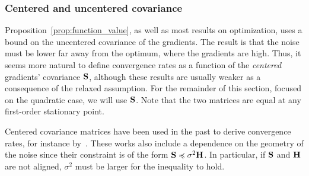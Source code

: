 \subsubsection{Centered and uncentered covariance}
Proposition~\ref{prop:function_value}, as well as most results on optimization, uses a bound on the uncentered covariance of the gradients. The result is that the noise must be lower far away from the optimum, where the gradients are high. Thus, it seems more natural to define convergence rates as a function of the \emph{centered} gradients' covariance ${\mathbf{S}}$, although these results are usually weaker as a consequence of the relaxed assumption. For the remainder of this section, focused on the quadratic case, we will use ${\mathbf{S}}$. Note that the two matrices are equal at any first-order stationary point.

Centered covariance matrices have been used in the past to derive convergence rates, for instance by~\citet{bach2013non,flammarion2015averaging,dieuleveut2016nonparametric}. These works also include a dependence on the geometry of the noise since their constraint is of the form ${\mathbf{S}} \preccurlyeq \sigma^2 {\mathbf{H}}$. In particular, if ${\mathbf{S}}$ and ${\mathbf{H}}$ are not aligned, $\sigma^2$ must be larger for the inequality to hold.

